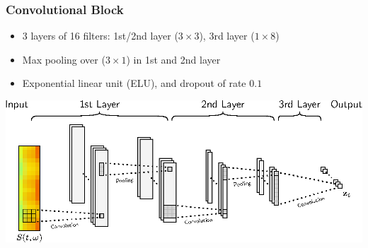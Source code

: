 \documentclass{beamer}
\begin{document}
\begin{frame}
\frametitle{Convolutional Block}
\begin{itemize}
\item 3 layers of 16 filters: 1st/2nd layer ($3\times3$), 3rd layer ($1\times8$)
\item Max pooling over ($3\times1$) in 1st and 2nd layer
\item Exponential linear unit (ELU), and dropout of rate $0.1$
\end{itemize}
\begin{minipage}{\textwidth} 
\centering
\includegraphics[scale=0.9]{figures/conv_block_color.eps}
\end{minipage}

\end{frame}
\end{document}
